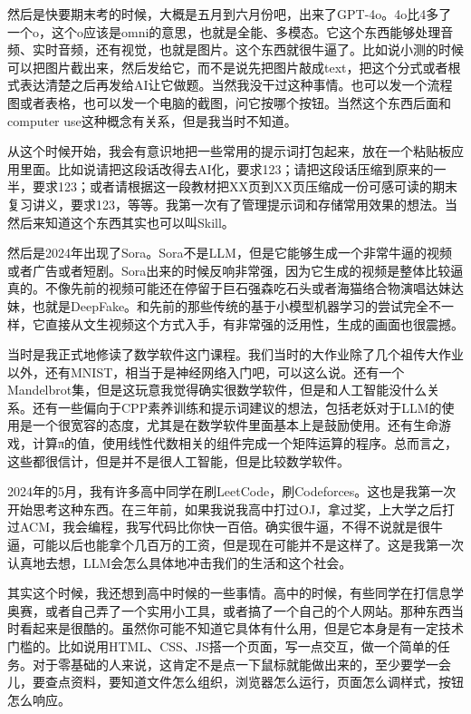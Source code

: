 然后是快要期末考的时候，大概是五月到六月份吧，出来了GPT-4o。4o比4多了一个o，这个o应该是omni的意思，也就是全能、多模态。它这个东西能够处理音频、实时音频，还有视觉，也就是图片。这个东西就很牛逼了。比如说小测的时候可以把图片截出来，然后发给它，而不是说先把图片敲成text，把这个分式或者根式表达清楚之后再发给AI让它做题。当然我没干过这种事情。也可以发一个流程图或者表格，也可以发一个电脑的截图，问它按哪个按钮。当然这个东西后面和computer use这种概念有关系，但是我当时不知道。

从这个时候开始，我会有意识地把一些常用的提示词打包起来，放在一个粘贴板应用里面。比如说请把这段话改得去AI化，要求123；请把这段话压缩到原来的一半，要求123；或者请根据这一段教材把XX页到XX页压缩成一份可感可读的期末复习讲义，要求123，等等。我第一次有了管理提示词和存储常用效果的想法。当然后来知道这个东西其实也可以叫Skill。

然后是2024年出现了Sora。Sora不是LLM，但是它能够生成一个非常牛逼的视频或者广告或者短剧。Sora出来的时候反响非常强，因为它生成的视频是整体比较逼真的。不像先前的视频可能还在停留于巨石强森吃石头或者海猫络合物演唱达妹达妹，也就是DeepFake。和先前的那些传统的基于小模型机器学习的尝试完全不一样，它直接从文生视频这个方式入手，有非常强的泛用性，生成的画面也很震撼。

当时是我正式地修读了数学软件这门课程。我们当时的大作业除了几个祖传大作业以外，还有MNIST，相当于是神经网络入门吧，可以这么说。还有一个Mandelbrot集，但是这玩意我觉得确实很数学软件，但是和人工智能没什么关系。还有一些偏向于CPP素养训练和提示词建议的想法，包括老妖对于LLM的使用是一个很宽容的态度，尤其是在数学软件里面基本上是鼓励使用。还有生命游戏，计算π的值，使用线性代数相关的组件完成一个矩阵运算的程序。总而言之，这些都很信计，但是并不是很人工智能，但是比较数学软件。

2024年的5月，我有许多高中同学在刷LeetCode，刷Codeforces。这也是我第一次开始思考这种东西。在三年前，如果我说我高中打过OJ，拿过奖，上大学之后打过ACM，我会编程，我写代码比你快一百倍。确实很牛逼，不得不说就是很牛逼，可能以后也能拿个几百万的工资，但是现在可能并不是这样了。这是我第一次认真地去想，LLM会怎么具体地冲击我们的生活和这个社会。

其实这个时候，我还想到高中时候的一些事情。高中的时候，有些同学在打信息学奥赛，或者自己弄了一个实用小工具，或者搞了一个自己的个人网站。那种东西当时看起来是很酷的。虽然你可能不知道它具体有什么用，但是它本身是有一定技术门槛的。比如说用HTML、CSS、JS搭一个页面，写一点交互，做一个简单的任务。对于零基础的人来说，这肯定不是点一下鼠标就能做出来的，至少要学一会儿，要查点资料，要知道文件怎么组织，浏览器怎么运行，页面怎么调样式，按钮怎么响应。

